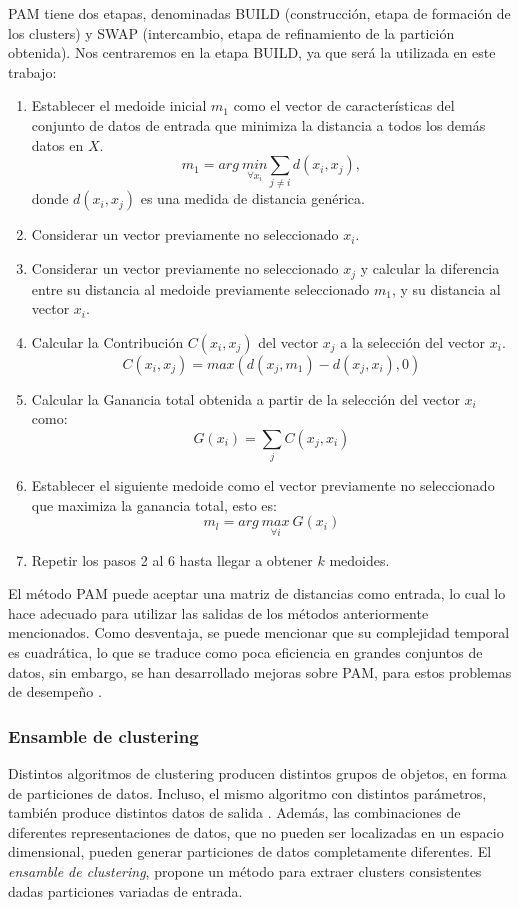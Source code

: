\bigskip PAM tiene dos etapas, denominadas BUILD (construcción, etapa de formación de los clusters) y SWAP (intercambio, etapa de refinamiento de la partición obtenida). Nos centraremos en la etapa BUILD, ya que será la utilizada en este trabajo:
\begin{enumerate}
	\item Establecer el medoide inicial \(m_1\) como el vector de características del conjunto de datos de entrada que minimiza la distancia a todos los demás datos en \(X\).
\[m_1 = arg \> \underset{\forall x_i}{min} \sum_{j \neq i}d(x_i,x_j),\]
donde \(d(x_i,x_j)\) es una medida de distancia genérica.
	\item Considerar un vector previamente no seleccionado \(x_i\).
	\item Considerar un vector previamente no seleccionado \(x_j\) y calcular la diferencia entre su distancia al medoide previamente seleccionado \(m_1\), y su distancia al vector \(x_i\).
	\item Calcular la Contribución \(C(x_i,x_j)\) del vector \(x_j\) a la selección del vector \(x_i\).
\[C(x_i, x_j) = max(d(x_j, m_1) - d(x_j, x_i), 0)\]
	\item Calcular la Ganancia total obtenida a partir de la selección del vector \(x_i\) como:
\[G(x_i) = \sum_{j} C(x_j, x_i)\]
	\item Establecer el siguiente medoide como el vector previamente no seleccionado que maximiza la ganancia total, esto es:
\[m_l = arg \> \underset{\forall i}{max} \> G(x_i)\]
	\item Repetir los pasos 2 al 6 hasta llegar a obtener \(k\) medoides.
\end{enumerate}

\bigskip El método PAM puede aceptar una matriz de distancias como entrada, lo cual lo hace adecuado para utilizar las salidas de los métodos anteriormente mencionados. Como desventaja, se puede mencionar que su complejidad temporal es cuadrática, lo que se traduce como poca eficiencia en grandes conjuntos de datos, sin embargo, se han desarrollado mejoras sobre PAM, para estos problemas de desempeño \citep{kaufman2009finding}.

\subsubsection{Ensamble de clustering}
Distintos algoritmos de clustering producen distintos grupos de objetos, en forma de particiones de datos. Incluso, el mismo algoritmo con distintos parámetros, también produce distintos datos de salida \citep{xu2008clustering}. Además, las combinaciones de diferentes representaciones de datos, que no pueden ser localizadas en un espacio dimensional, pueden generar particiones de datos completamente diferentes. El \textit{ensamble de clustering}, propone un método para extraer clusters consistentes dadas particiones variadas de entrada.

